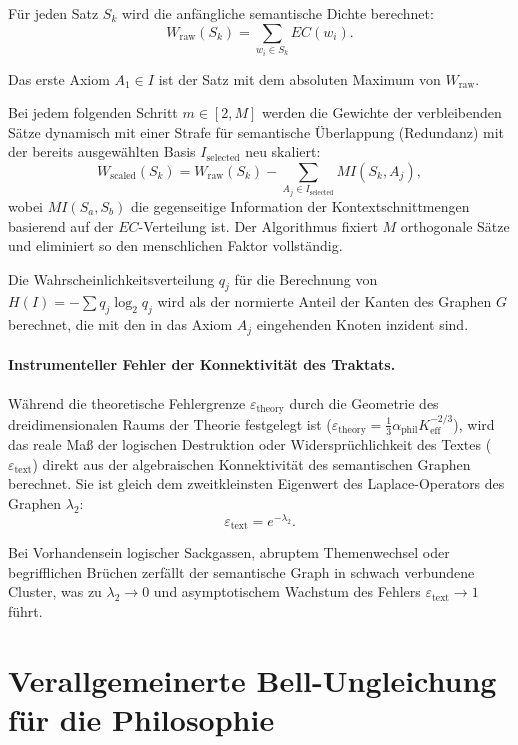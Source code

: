 \documentclass[12pt,a4paper]{article}
\begin{document}
	Für jeden Satz \(S_{k}\) wird die anfängliche semantische Dichte berechnet:
	\[
	W_{\text{raw}}(S_k) = \sum_{w_i \in S_k} EC(w_i).
	\]
	
	Das erste Axiom \(A_1 \in I\) ist der Satz mit dem absoluten Maximum von \(W_{\text{raw}}\).
	
	Bei jedem folgenden Schritt \(m \in [2, M]\) werden die Gewichte der verbleibenden Sätze dynamisch mit einer Strafe für semantische Überlappung (Redundanz) mit der bereits ausgewählten Basis \(I_{\text{selected}}\) neu skaliert:
	\[
	W_{\text{scaled}}(S_{k}) = W_{\text{raw}}(S_{k}) - \sum_{A_{j} \in I_{\text{selected}}} MI(S_{k}, A_{j}),
	\]
	wobei \(MI(S_a, S_b)\) die gegenseitige Information der Kontextschnittmengen basierend auf der \(EC\)-Verteilung ist. Der Algorithmus fixiert \(M\) orthogonale Sätze und eliminiert so den menschlichen Faktor vollständig.
	
	Die Wahrscheinlichkeitsverteilung \(q_{j}\) für die Berechnung von \(H(I) = -\sum q_j \log_2 q_j\) wird als der normierte Anteil der Kanten des Graphen \(G\) berechnet, die mit den in das Axiom \(A_{j}\) eingehenden Knoten inzident sind.
	
	\paragraph{Instrumenteller Fehler der Konnektivität des Traktats.}
	Während die theoretische Fehlergrenze \(\varepsilon_{\text{theory}}\) durch die Geometrie des dreidimensionalen Raums der Theorie festgelegt ist (\(\varepsilon_{\text{theory}} = \frac{1}{3} \alpha_{\text{phil}} K_{\text{eff}}^{-2/3}\)), wird das reale Maß der logischen Destruktion oder Widersprüchlichkeit des Textes (\(\varepsilon_{\text{text}}\)) direkt aus der algebraischen Konnektivität des semantischen Graphen berechnet. Sie ist gleich dem zweitkleinsten Eigenwert des Laplace-Operators des Graphen \(\lambda_{2}\):
	\[
	\varepsilon_{\text{text}} = e^{-\lambda_{2}}.
	\]
	
	Bei Vorhandensein logischer Sackgassen, abruptem Themenwechsel oder begrifflichen Brüchen zerfällt der semantische Graph in schwach verbundene Cluster, was zu \(\lambda_2 \to 0\) und asymptotischem Wachstum des Fehlers \(\varepsilon_{\text{text}} \to 1\) führt.
	
	\section{Verallgemeinerte Bell-Ungleichung für die Philosophie}
	
\end{document}
